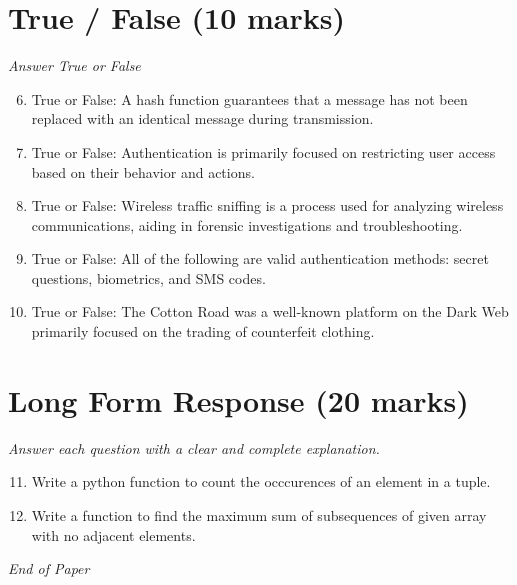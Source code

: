 \documentclass[12pt]{article}
\begin{document}
\section*{True / False (10 marks)}
\textit{Answer True or False}
\begin{enumerate}[label=\arabic*.]
\setcounter{enumi}{5}
\item True or False: A hash function guarantees that a message has not been replaced with an identical message during transmission.
\item True or False: Authentication is primarily focused on restricting user access based on their behavior and actions.
\item True or False: Wireless traffic sniffing is a process used for analyzing wireless communications, aiding in forensic investigations and troubleshooting.
\item True or False: All of the following are valid authentication methods: secret questions, biometrics, and SMS codes.
\item True or False: The Cotton Road was a well-known platform on the Dark Web primarily focused on the trading of counterfeit clothing.
\end{enumerate}

\section*{Long Form Response (20 marks)}
\textit{Answer each question with a clear and complete explanation.}
\begin{enumerate}[label=\arabic*.]
\setcounter{enumi}{10}
\item Write a python function to count the occcurences of an element in a tuple.
\item Write a function to find the maximum sum of subsequences of given array with no adjacent elements.
\end{enumerate}

\vfill
\noindent\textit{End of Paper}
\end{document}
